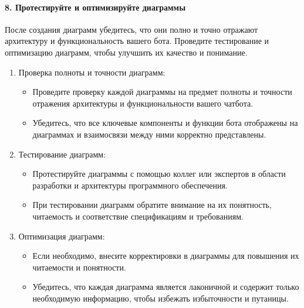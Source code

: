 \documentclass[letterpaper,10pt,russian]{sphinxmanual}
\begin{document}
\paragraph{8. Протестируйте и оптимизируйте диаграммы}
\label{\detokenize{educational_materials/uml/content:id17}}
\sphinxAtStartPar
После создания диаграмм убедитесь, что они полно и точно отражают архитектуру и функциональность вашего бота. Проведите тестирование и оптимизацию диаграмм, чтобы улучшить их качество и понимание.
\begin{enumerate}
%
\item {} 
\sphinxAtStartPar
Проверка полноты и точности диаграмм:
\begin{itemize}
\item {} 
\sphinxAtStartPar
Проведите проверку каждой диаграммы на предмет полноты и точности отражения архитектуры и функциональности вашего чат\sphinxhyphen{}бота.

\item {} 
\sphinxAtStartPar
Убедитесь, что все ключевые компоненты и функции бота отображены на диаграммах и взаимосвязи между ними корректно представлены.

\end{itemize}

\item {} 
\sphinxAtStartPar
Тестирование диаграмм:
\begin{itemize}
\item {} 
\sphinxAtStartPar
Протестируйте диаграммы с помощью коллег или экспертов в области разработки и архитектуры программного обеспечения.

\item {} 
\sphinxAtStartPar
При тестировании диаграмм обратите внимание на их понятность, читаемость и соответствие спецификациям и требованиям.

\end{itemize}

\item {} 
\sphinxAtStartPar
Оптимизация диаграмм:
\begin{itemize}
\item {} 
\sphinxAtStartPar
Если необходимо, внесите корректировки в диаграммы для повышения их читаемости и понятности.

\item {} 
\sphinxAtStartPar
Убедитесь, что каждая диаграмма является лаконичной и содержит только необходимую информацию, чтобы избежать избыточности и путаницы.


\end{itemize}
\end{enumerate}
\end{document}
